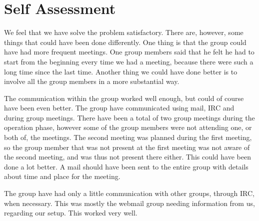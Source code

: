 \section{Self Assessment}
We feel that we have solve the problem satisfactory. There are, however,
some things that could have been done differently. One thing is that the
group could have had more frequent meetings. One group members said that
he felt he had to start from the beginning every time we had a meeting,
because there were such a long time since the last time. Another thing
we could have done better is to involve all the group members in a more
substantial way. 

The communication within the group worked well enough, but could of
course have been even better. The group have communicated using mail,
IRC and during group meetings. There have been a total of two group
meetings during the operation phase, however some of the group members
were not attending one, or both of, the meetings. The second meeting was
planned during the first meeting, so the group member that was not
present at the first meeting was not aware of the second meeting, and
was thus not present there either. This could have been done a lot
better. A mail should have been sent to the entire group with details
about time and place for the meeting.

The group have had only a little communication with other groups,
through IRC, when necessary. This was mostly the webmail group needing
information from us, regarding our setup. This worked very well.
